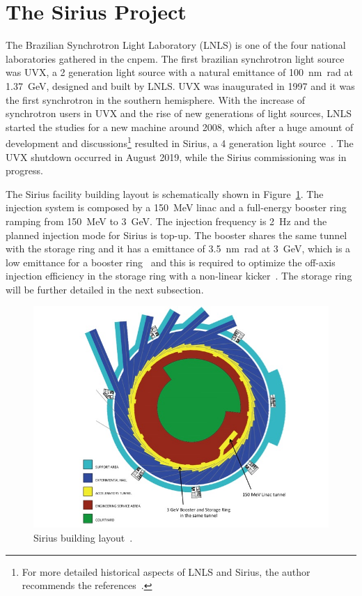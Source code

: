 \section{The Sirius Project}\label{sec:sirius_project}
The Brazilian Synchrotron Light Laboratory (LNLS) is one of the four national laboratories gathered in the \gls{cnpem}. The first brazilian synchrotron light source was UVX, a 2 generation light source with a natural emittance of \SI{100}{\nano\meter\radian} at \SI{1.37}{\giga\electronvolt}, designed and built by LNLS. UVX was inaugurated in 1997 and it was the first synchrotron in the southern hemisphere. With the increase of synchrotron users in UVX and the rise of new generations of light sources, LNLS started the studies for a new machine around 2008, which after a huge amount of development and discussions\footnote{For more detailed historical aspects of LNLS and Sirius, the author recommends the references~\cite{liu2019, aldo2019}.} resulted in Sirius, a 4 generation light source~\cite{liu2014}. The UVX shutdown occurred in August 2019, while the Sirius commissioning was in progress.

The Sirius facility building layout is schematically shown in Figure~\ref{fig:sirius_building}. The injection system is composed by a \SI{150}{\mega\electronvolt} \gls{linac} and a full-energy booster ring ramping from \SI{150}{\mega\electronvolt} to \SI{3}{\giga\electronvolt}. The injection frequency is \SI{2}{\hertz} and the planned injection mode for Sirius is top-up. The booster shares the same tunnel with the storage ring and it has a emittance of \SI{3.5}{\nano\meter\radian} at \SI{3}{\giga\electronvolt}, which is a low emittance for a booster ring~\cite{sa2014a} and this is required to optimize the off-axis injection efficiency in the storage ring with a non-linear kicker~\cite{liu2016a}. The storage ring will be further detailed in the next subsection.
\begin{figure}
    \centering
    \includegraphics[scale=0.5]{figures/sirius_building.jpg}
    \caption{Sirius building layout~\cite{wiki}.}
    \label{fig:sirius_building}
\end{figure}
